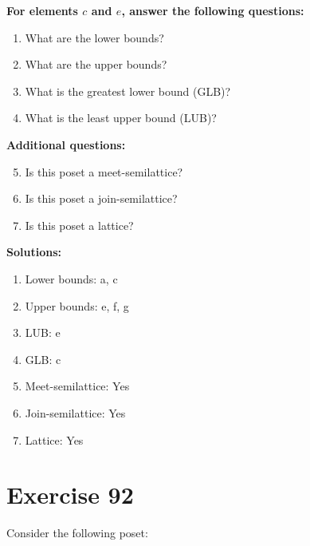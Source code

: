 \documentclass{article}
\begin{document}
    \textbf{For elements $c$ and $e$, answer the following questions:}
\begin{enumerate}
    \item What are the lower bounds?
    \item What are the upper bounds?
    \item What is the greatest lower bound (GLB)?
    \item What is the least upper bound (LUB)?
\end{enumerate}
    \hspace*{3ex} \textbf{Additional questions:}
\begin{enumerate}
    \setcounter{enumi}{4}
    \item Is this poset a meet-semilattice?
    \item Is this poset a join-semilattice?
    \item Is this poset a lattice?
\end{enumerate}

\textbf{Solutions:}
\begin{enumerate}
    \item Lower bounds: {a, c}
    \item Upper bounds: {e, f, g}
    \item LUB: e
    \item GLB: c
    \item Meet-semilattice: Yes
    \item Join-semilattice: Yes
    \item Lattice: Yes
\end{enumerate}
\newpage
\section*{Exercise 92}
Consider the following poset:
\begin{center}
\end{center}
\end{document}
